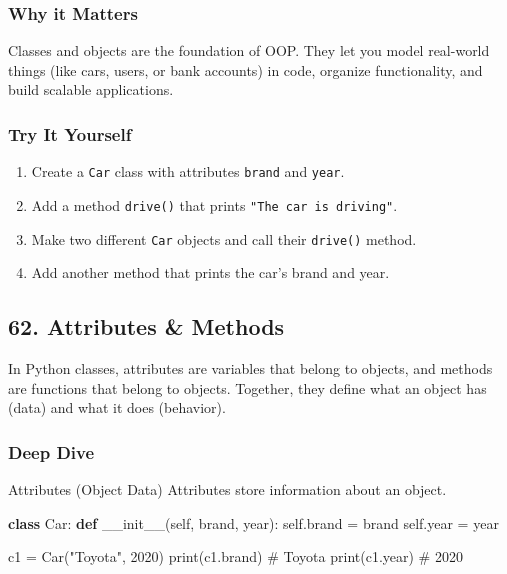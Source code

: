 \documentclass[
  letterpaper,
  DIV=11,
  numbers=noendperiod]{scrreprt}
\newenvironment{Shaded}{\begin{snugshade}}{\end{snugshade}}
\newcommand{\BuiltInTok}[1]{\textcolor[rgb]{0.00,0.23,0.31}{#1}}
\newcommand{\CommentTok}[1]{\textcolor[rgb]{0.37,0.37,0.37}{#1}}
\newcommand{\DecValTok}[1]{\textcolor[rgb]{0.68,0.00,0.00}{#1}}
\newcommand{\FunctionTok}[1]{\textcolor[rgb]{0.28,0.35,0.67}{#1}}
\newcommand{\KeywordTok}[1]{\textcolor[rgb]{0.00,0.23,0.31}{\textbf{#1}}}
\newcommand{\NormalTok}[1]{\textcolor[rgb]{0.00,0.23,0.31}{#1}}
\newcommand{\OperatorTok}[1]{\textcolor[rgb]{0.37,0.37,0.37}{#1}}
\newcommand{\StringTok}[1]{\textcolor[rgb]{0.13,0.47,0.30}{#1}}
\newcommand{\VariableTok}[1]{\textcolor[rgb]{0.07,0.07,0.07}{#1}}
\providecommand{\tightlist}{%
  \setlength{\itemsep}{0pt}\setlength{\parskip}{0pt}}
\begin{document}
\subsubsection{Why it Matters}\label{why-it-matters-60}

Classes and objects are the foundation of OOP. They let you model
real-world things (like cars, users, or bank accounts) in code, organize
functionality, and build scalable applications.

\subsubsection{Try It Yourself}\label{try-it-yourself-60}

\begin{enumerate}
\def\labelenumi{\arabic{enumi}.}
\tightlist
\item
  Create a \texttt{Car} class with attributes \texttt{brand} and
  \texttt{year}.
\item
  Add a method \texttt{drive()} that prints
  \texttt{"The\ car\ is\ driving"}.
\item
  Make two different \texttt{Car} objects and call their
  \texttt{drive()} method.
\item
  Add another method that prints the car's brand and year.
\end{enumerate}

\subsection{62. Attributes \& Methods}\label{attributes-methods}

In Python classes, attributes are variables that belong to objects, and
methods are functions that belong to objects. Together, they define what
an object has (data) and what it does (behavior).

\subsubsection{Deep Dive}\label{deep-dive-61}

Attributes (Object Data) Attributes store information about an object.

\begin{Shaded}
\begin{Highlighting}[]
\KeywordTok{class}\NormalTok{ Car:}
    \KeywordTok{def} \FunctionTok{\_\_init\_\_}\NormalTok{(}\VariableTok{self}\NormalTok{, brand, year):}
        \VariableTok{self}\NormalTok{.brand }\OperatorTok{=}\NormalTok{ brand}
        \VariableTok{self}\NormalTok{.year }\OperatorTok{=}\NormalTok{ year}

\NormalTok{c1 }\OperatorTok{=}\NormalTok{ Car(}\StringTok{"Toyota"}\NormalTok{, }\DecValTok{2020}\NormalTok{)}
\BuiltInTok{print}\NormalTok{(c1.brand)   }\CommentTok{\# Toyota}
\BuiltInTok{print}\NormalTok{(c1.year)    }\CommentTok{\# 2020}
\end{Highlighting}
\end{Shaded}
\end{document}
